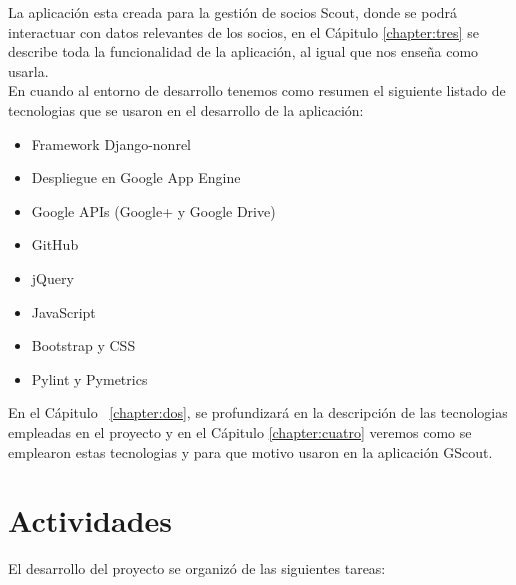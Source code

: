 La aplicación esta creada para la gestión de socios Scout, donde se podrá interactuar con datos relevantes de los socios, en el Cápitulo \ref{chapter:tres}
se describe toda la funcionalidad de la aplicación, al igual que nos enseña como usarla.\\

En cuando al entorno de desarrollo tenemos como resumen el siguiente listado de tecnologias que se usaron en el desarrollo de la aplicación:\\

\begin{itemize}
  \item Framework Django-nonrel
  \item Despliegue en Google App Engine
  \item Google APIs (Google+ y Google Drive)
  \item GitHub
  \item jQuery
  \item JavaScript
  \item Bootstrap y CSS
  \item Pylint y Pymetrics
  
\end{itemize}
En el Cápitulo ~\ref{chapter:dos}, se profundizará en la descripción de las tecnologias empleadas en el proyecto y en el Cápitulo \ref{chapter:cuatro} 
veremos como se emplearon estas tecnologias y para que motivo usaron en la aplicación GScout.\\

\section{Actividades}
\label{1:sec:3}
El desarrollo del proyecto se organizó de las siguientes tareas:


